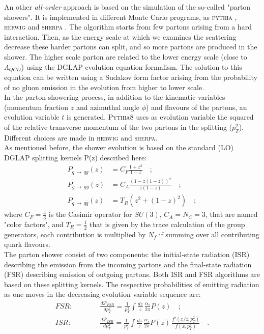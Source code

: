 An other \textit{all-order} approach is based on the simulation of the so-called "parton showers". It is  implemented in different Monte Carlo programs, as  \textsc{pythia} \cite{PYTHIA2015}, \textsc{herwig} \cite{Herwig2008} and \textsc{sherpa} \cite{SHERPA2004}. 
The algorithm starts from few partons arising from a hard interaction. Then, as the energy scale at which we examines the scattering decrease these harder partons can split, and so more partons are produced in the shower. The higher scale parton are related to the lower energy scale (close to $\Lambda_{QCD}$) using the DGLAP evolution equation formalism. The solution to this equation can be written using a Sudakov form factor arising from the probability of no gluon emission in the evolution from higher to lower scale.
\\
In the parton showering process, in addition to the kinematic variables (momentum fraction $z$ and azimuthal angle $\phi$) and flavours of the partons, an evolution variable $t$ is generated. \textsc{Pythia8} uses as  evolution variable the squared of the relative transverse momentum of the two partons in the splitting ($p_T^2$). Different choices are made in \textsc{herwig} and \textsc{sherpa}.
\\
As mentioned before, the shower evolution is based on the standard (LO) DGLAP splitting kernels P(z) described here:
\begin{align}
P_{q\,\rightarrow\,qg}(z) & = C_F\frac{1+z^2}{1-z}\quad ; \\
P_{g\,\rightarrow\,gg}(z) & = C_A\frac{(1-z(1-z))^2}{z(1-z)}\quad ; \\
P_{q\,\rightarrow\,q\overline{q}}(z) & = T_R(z^2+(1-z)^2)\quad ;
\end{align} 
where $C_F=\frac{4}{3}$ is the Casimir operator for $SU(3)$, $C_A=N_C=3$, that are named "color factors", and $T_R=\frac{1}{2}$ that is given by the trace calculation of the group generators, each contribution is multiplied by $N_f$ if summing over all contributing quark flavours.
\\
The parton shower consist of two components: the initial-state radiation (ISR) describing the emission from the incoming partons and the final-state radiation (FSR) describing emission of outgoing partons.
Both ISR and FSR algorithms are based on these splitting kernels.
The respective probabilities of emitting radiation as one moves in the decreasing evolution variable sequence are:
\begin{align}
	FSR: \qquad\quad & \frac{d\mathcal{P}_{FSR}}{dp_T^2} = \frac{1}{p_T^2}\displaystyle\int \frac{dz}{z}\,\frac{\alpha_s}{2\pi}P(z)\quad ;\label{eq:FSR1}\\
	ISR: \qquad\quad & \frac{d\mathcal{P}_{ISR}}{dp_T^2} = \frac{1}{p_T^2}\displaystyle\int \frac{dz}{z}\,\frac{\alpha_s}{2\pi}P(z)\,\frac{f'(x/z,p_T^2)}{f(x,p_T^2)}\quad .\label{eq:ISR1}
\end{align}
